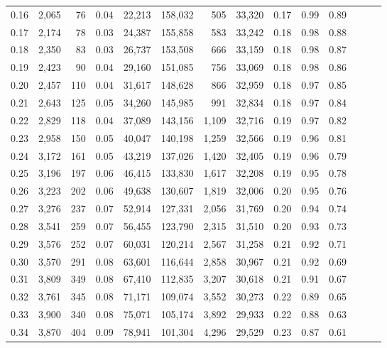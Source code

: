 \begin{tabular}{rrrrrrrrrrrrrr}
0.16 &  2,065 &   76 &  0.04 &   22,213 &  158,032 &     505 &  33,320 &  0.17 &  0.99 &      0.89 \\
0.17 &  2,174 &   78 &  0.03 &   24,387 &  155,858 &     583 &  33,242 &  0.18 &  0.98 &      0.88 \\
0.18 &  2,350 &   83 &  0.03 &   26,737 &  153,508 &     666 &  33,159 &  0.18 &  0.98 &      0.87 \\
0.19 &  2,423 &   90 &  0.04 &   29,160 &  151,085 &     756 &  33,069 &  0.18 &  0.98 &      0.86 \\
0.20 &  2,457 &  110 &  0.04 &   31,617 &  148,628 &     866 &  32,959 &  0.18 &  0.97 &      0.85 \\
0.21 &  2,643 &  125 &  0.05 &   34,260 &  145,985 &     991 &  32,834 &  0.18 &  0.97 &      0.84 \\
0.22 &  2,829 &  118 &  0.04 &   37,089 &  143,156 &   1,109 &  32,716 &  0.19 &  0.97 &      0.82 \\
0.23 &  2,958 &  150 &  0.05 &   40,047 &  140,198 &   1,259 &  32,566 &  0.19 &  0.96 &      0.81 \\
0.24 &  3,172 &  161 &  0.05 &   43,219 &  137,026 &   1,420 &  32,405 &  0.19 &  0.96 &      0.79 \\
0.25 &  3,196 &  197 &  0.06 &   46,415 &  133,830 &   1,617 &  32,208 &  0.19 &  0.95 &      0.78 \\
0.26 &  3,223 &  202 &  0.06 &   49,638 &  130,607 &   1,819 &  32,006 &  0.20 &  0.95 &      0.76 \\
0.27 &  3,276 &  237 &  0.07 &   52,914 &  127,331 &   2,056 &  31,769 &  0.20 &  0.94 &      0.74 \\
0.28 &  3,541 &  259 &  0.07 &   56,455 &  123,790 &   2,315 &  31,510 &  0.20 &  0.93 &      0.73 \\
0.29 &  3,576 &  252 &  0.07 &   60,031 &  120,214 &   2,567 &  31,258 &  0.21 &  0.92 &      0.71 \\
0.30 &  3,570 &  291 &  0.08 &   63,601 &  116,644 &   2,858 &  30,967 &  0.21 &  0.92 &      0.69 \\
0.31 &  3,809 &  349 &  0.08 &   67,410 &  112,835 &   3,207 &  30,618 &  0.21 &  0.91 &      0.67 \\
0.32 &  3,761 &  345 &  0.08 &   71,171 &  109,074 &   3,552 &  30,273 &  0.22 &  0.89 &      0.65 \\
0.33 &  3,900 &  340 &  0.08 &   75,071 &  105,174 &   3,892 &  29,933 &  0.22 &  0.88 &      0.63 \\
0.34 &  3,870 &  404 &  0.09 &   78,941 &  101,304 &   4,296 &  29,529 &  0.23 &  0.87 &      0.61 \\

\end{tabular}
